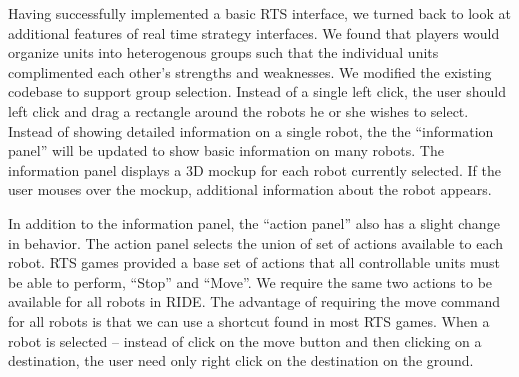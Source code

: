 Having successfully implemented a basic RTS interface, we turned back to look at additional features of real time strategy interfaces. We found that players would organize units into heterogenous groups such that the individual units complimented each other's strengths and weaknesses. We modified the existing codebase to support group selection. Instead of a single left click, the user should left click and drag a rectangle around the robots he or she wishes to select. Instead of showing detailed information on a single robot, the the ``information panel'' will be updated to show basic information on many robots. The information panel displays a 3D mockup for each robot currently selected. If the user mouses over the mockup, additional information about the robot appears.

In addition to the information panel, the ``action panel'' also has a slight change in behavior. The action panel selects the union of set of actions available to each robot. RTS games provided a base set of actions that all controllable units must be able to perform, ``Stop'' and ``Move''. We require the same two actions to be available for all robots in RIDE. The advantage of requiring the move command for all robots is that we can use a shortcut found in most RTS games. When a robot is selected -- instead of click on the move button and then clicking on a destination, the user need only right click on the destination on the ground.


% 
% 
% 
% 

